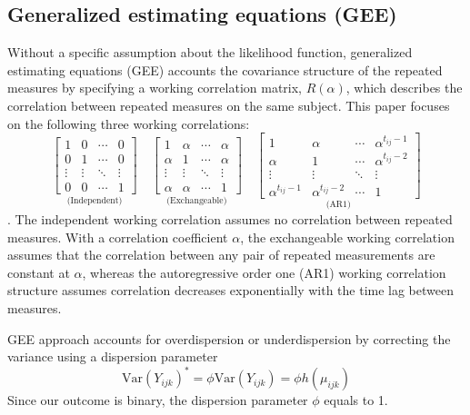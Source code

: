 \documentclass[
]{aft}
\begin{document}
\subsection{Generalized estimating equations
(GEE)}\label{generalized-estimating-equations-gee}

Without a specific assumption about the likelihood function, generalized
estimating equations (GEE) accounts the covariance structure of the
repeated measures by specifying a working correlation matrix,
\(R(\alpha)\), which describes the correlation between repeated measures
on the same subject. This paper focuses on the following three working
correlations: \[
\underset{\text{(Independent)}}{\begin{bmatrix}
1 & 0 & \cdots & 0\\
0 & 1 & \cdots &  0\\
\vdots & \vdots & \ddots & \vdots\\
0 & 0 & \cdots & 1
\end{bmatrix}}
\quad
\underset{\text{(Exchangeable)}}{\begin{bmatrix}
1 & \alpha & \cdots & \alpha\\
\alpha & 1 & \cdots & \alpha\\
\vdots & \vdots & \ddots & \vdots\\
\alpha & \alpha & \cdots & 1
\end{bmatrix}}
\quad
\underset{\text{(AR1)}}{\begin{bmatrix}
1 & \alpha & \cdots & \alpha^{t_{ij} - 1}\\
\alpha & 1 & \cdots & \alpha^{t_{ij} - 2}\\
\vdots & \vdots & \ddots & \vdots\\
\alpha^{t_{ij} - 1} & \alpha^{t_{ij} - 2} & \cdots & 1
\end{bmatrix}}
\] . The independent working correlation assumes no correlation between
repeated measures. With a correlation coefficient \(\alpha\), the
exchangeable working correlation assumes that the correlation between
any pair of repeated measurements are constant at \(\alpha\), whereas
the autoregressive order one (AR1) working correlation structure assumes
correlation decreases exponentially with the time lag between measures.

GEE approach accounts for overdispersion or underdispersion by
correcting the variance using a dispersion parameter \[
\text{Var}(Y_{ijk})^* = \phi\text{Var}(Y_{ijk}) = \phi h(\mu_{ijk})
\] Since our outcome is binary, the dispersion parameter \(\phi\) equals
to 1.
\end{document}
